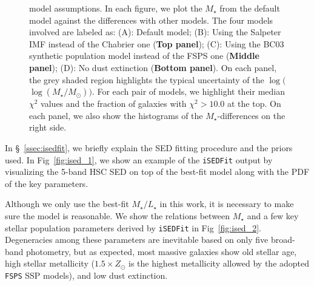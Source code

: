 \documentclass[a4paper,fleqn,usenatbib]{mnras}
\def\mstar{{$M_{\star}$}}
\def\logms{{$\log (M_{\star}/M_{\odot})$}}
\def\m2l{{$M_{\star}/L_{\star}$}}
\begin{document}
\begin{figure}
\begin{center}
{            model assumptions. 
            In each figure, we plot the \mstar{} from the default model against the
            differences with other models. 
            The four models involved are labeled as: 
            (A): Default model; 
            (B): Using the Salpeter IMF instead of the Chabrier one 
                (\textbf{Top panel});
            (C): Using the BC03 synthetic population model instead of the FSPS one
                (\textbf{Middle panel});
            (D): No dust extinction (\textbf{Bottom panel}). 
            On each panel, the grey shaded region highlights the typical uncertainty 
            of the $\log($\logms{}$)$.            
            For each pair of models, we highlight their median $\chi^{2}$ values and 
            the fraction of galaxies with $\chi^{2} > 10.0$ at the top. 
            On each panel, we also show the histograms of the \mstar{}-differences on 
            the right side.
            }
        \label{fig:ised_3}
        \end{center}
    \end{figure}

 
    In \S~\ref{ssec:isedfit}, we briefly explain the SED fitting procedure and 
    the priors used.   
    In Fig~\ref{fig:ised_1}, we show an example of the \texttt{iSEDFit} output by 
    visualizing the 5-band HSC SED on top of the best-fit model along with the PDF 
    of the key parameters.
     
    Although we only use the best-fit \m2l{} in this work, it is necessary to make 
    sure the model is reasonable. 
    We show the relations between \mstar{} and a few key stellar population parameters 
    derived by \texttt{iSEDFit} in Fig~\ref{fig:ised_2}. 
    Degeneracies among these parameters are inevitable based on only five broad-band
    photometry, but as expected, most massive galaxies show old stellar age, high
    stellar metallicity ($1.5 \times Z_{\odot}$ is the highest metallicity allowed by 
    the adopted \texttt{FSPS} SSP models), and low dust extinction.
   
\end{document}
